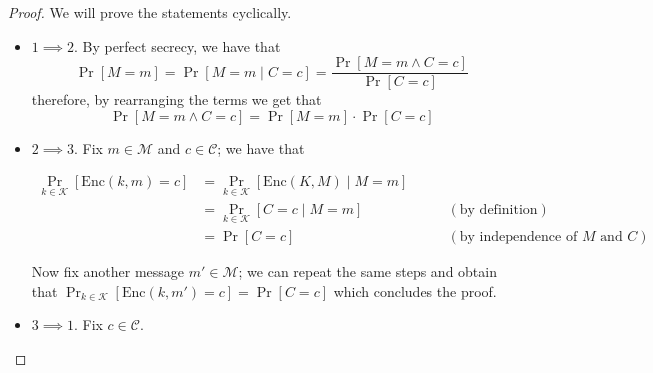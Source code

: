 \documentclass[a4paper, 12pt]{report}
\begin{document}
\begin{proof}
	We will prove the statements cyclically.

	\begin{itemize}
		\item $1 \implies 2$. By perfect secrecy, we have that $$\Pr[M = m] = \Pr[M = m \mid C = c] = \dfrac{\Pr[M = m \land C = c]}{\Pr[C = c]}$$ therefore, by rearranging the terms we get that $$\Pr[M = m \land C = c] = \Pr[M = m] \cdot \Pr[C = c]$$
		\item $2 \implies 3$. Fix $m \in \mathcal M$ and $c \in \mathcal C$; we have that

		      \begin{equation*}
			      \begin{alignedat}{2}
				      \Pr_{k \in \mathcal K}[\mathrm{Enc}(k, m) = c] & = \Pr_{k \in \mathcal K}[\mathrm{Enc}(K, M) \mid M = m] &                                                     \\
				                                                     & = \Pr_{k \in \mathcal K}[C = c \mid M = m]              & \quad \quad (\mbox{by definition})                  \\
				                                                     & = \Pr[C = c]                                            & \quad \quad (\mbox{by independence of $M$ and $C$})
			      \end{alignedat}
		      \end{equation*}

		      Now fix another message $m' \in \mathcal M$; we can repeat the same steps and obtain that $\Pr_{k \in \mathcal K}[\mathrm{Enc}(k, m') = c] = \Pr[C = c]$ which concludes the proof.
		\item $3 \implies 1$. Fix $c \in \mathcal C$.

\end{itemize}
\end{proof}
\end{document}
